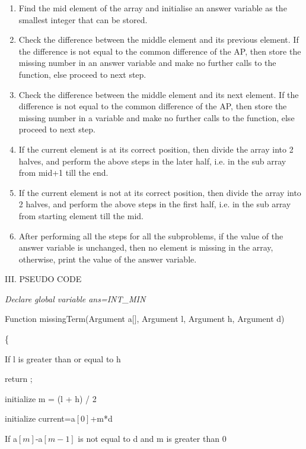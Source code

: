 \documentclass[12pt,a4paper]{article}
\begin{document}
\begin{multicols}{2}
\begin{enumerate}
\item Find the mid element of the array and initialise an answer variable as the smallest integer that can be stored.
\item Check the difference between the middle element and its previous element. If the difference is not equal to the common difference of the AP, then store the missing number in an answer variable and make no further calls to the function, else proceed to next step.
\item Check the difference between the middle element and its next element. If the difference is not equal to the common difference of the AP, then store the missing number in a variable and make no further calls to the function, else proceed to next step.
\item If the current element is at its correct position, then divide the array into 2 halves, and perform the above steps in the later half, i.e. in the sub array from mid+1 till the end.
\item If the current element is not at its correct position, then divide the array into 2 halves, and perform the above steps in the first half, i.e. in the sub array from starting element till the mid.
\item After performing all the steps for all the subproblems, if the value of the answer variable is unchanged, then no element is missing in the array, otherwise, print the value of the answer variable.
\setcounter{numberedCntA}{\theenumi}
\end{enumerate}




\begin{center}III. PSEUDO CODE\end{center}

\textit{ Declare global variable ans=INT\_MIN}

Function missingTerm(Argument a$[$$]$, Argument l, Argument h, Argument d) 


\{ 

\quad  If l is greater than or equal to h 

\quad\quad return ; 



\quad initialize m = (l + h) / 2

\quad initialize current=a$[0]$+m*d



\quad If a$[m]$-a$[m-1]$ is not equal to d and m is greater than 0


\end{multicols}
\end{document}
